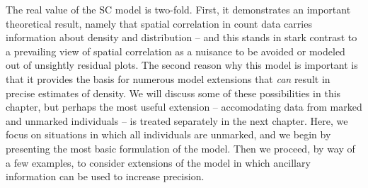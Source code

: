 The real value of the SC model is two-fold. First, it demonstrates
an important theoretical result, namely
that spatial correlation in
count data carries information about density and distribution -- and this
stands in stark contrast to a prevailing view of
spatial correlation as a nuisance to be avoided or modeled out of unsightly
residual plots. The second reason why this model is important is that
it provides the basis for numerous model extensions that \textit{can}
result in precise estimates of density. %
We will discuss some of
these possibilities in this chapter, but
perhaps the most useful extension -- accomodating %
data from marked and unmarked
individuals -- is treated separately in the next chapter. Here, we focus
on situations in which all individuals are unmarked, and
we begin by presenting the most basic formulation of the model. Then we proceed, by
way of a few examples, to consider extensions of the model in which
ancillary information can be used to increase precision.


